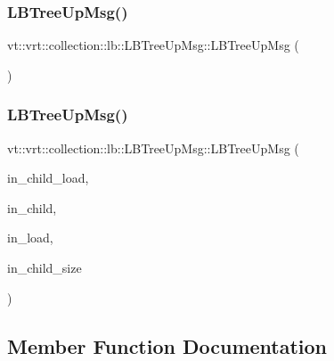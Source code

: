 \subsubsection{\texorpdfstring{L\+B\+Tree\+Up\+Msg()}{LBTreeUpMsg()}\hspace{0.1cm}{\footnotesize\ttfamily [1/2]}}
{\footnotesize\ttfamily vt\+::vrt\+::collection\+::lb\+::\+L\+B\+Tree\+Up\+Msg\+::\+L\+B\+Tree\+Up\+Msg (\begin{DoxyParamCaption}{ }\end{DoxyParamCaption})\hspace{0.3cm}{\ttfamily [default]}}

\mbox{\label{structvt_1_1vrt_1_1collection_1_1lb_1_1_l_b_tree_up_msg_ac2ff0f6b4a047ab11a0cd372c54a141e}} 
\subsubsection{\texorpdfstring{L\+B\+Tree\+Up\+Msg()}{LBTreeUpMsg()}\hspace{0.1cm}{\footnotesize\ttfamily [2/2]}}
{\footnotesize\ttfamily vt\+::vrt\+::collection\+::lb\+::\+L\+B\+Tree\+Up\+Msg\+::\+L\+B\+Tree\+Up\+Msg (\begin{DoxyParamCaption}\item[{\hyperlink{structvt_1_1vrt_1_1collection_1_1lb_1_1_l_b_tree_up_msg_a94e88fdd5142e26330a7feb8769de1bb}{Load\+Type} const}]{in\+\_\+child\+\_\+load,  }\item[{\hyperlink{namespacevt_a866da9d0efc19c0a1ce79e9e492f47e2}{Node\+Type} const}]{in\+\_\+child,  }\item[{\hyperlink{structvt_1_1vrt_1_1collection_1_1lb_1_1_hier_l_b_types_a597a60d517207b90e8c7984eac434e8f}{Obj\+Sample\+Type}}]{in\+\_\+load,  }\item[{\hyperlink{namespacevt_a866da9d0efc19c0a1ce79e9e492f47e2}{Node\+Type} const}]{in\+\_\+child\+\_\+size }\end{DoxyParamCaption})\hspace{0.3cm}{\ttfamily [inline]}}



\subsection{Member Function Documentation}
\mbox{\label{structvt_1_1vrt_1_1collection_1_1lb_1_1_l_b_tree_up_msg_a430d99ecbeb875f33ecd1b4c33c6ea5f}} 
